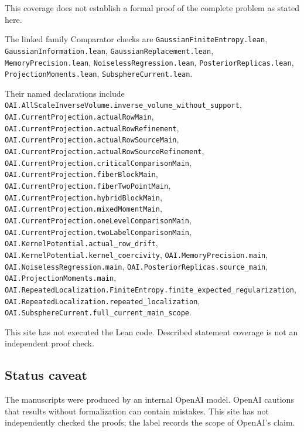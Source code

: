 \documentclass[11pt]{article}
\begin{document}
This coverage does not establish a formal proof of the complete problem as stated here.

The linked family Comparator checks are \texttt{GaussianFiniteEntropy.lean}, \texttt{GaussianInformation.lean}, \texttt{GaussianReplacement.lean}, \texttt{MemoryPrecision.lean}, \texttt{NoiselessRegression.lean}, \texttt{PosteriorReplicas.lean}, \texttt{ProjectionMoments.lean}, \texttt{SubsphereCurrent.lean}.

Their named declarations include \texttt{OAI.AllScaleInverseVolume.inverse\_volume\_without\_support}, \texttt{OAI.CurrentProjection.actualRowMain}, \texttt{OAI.CurrentProjection.actualRowRefinement}, \texttt{OAI.CurrentProjection.actualRowSourceMain}, \texttt{OAI.CurrentProjection.actualRowSourceRefinement}, \texttt{OAI.CurrentProjection.criticalComparisonMain}, \texttt{OAI.CurrentProjection.fiberBlockMain}, \texttt{OAI.CurrentProjection.fiberTwoPointMain}, \texttt{OAI.CurrentProjection.hybridBlockMain}, \texttt{OAI.CurrentProjection.mixedMomentMain}, \texttt{OAI.CurrentProjection.oneLevelComparisonMain}, \texttt{OAI.CurrentProjection.twoLabelComparisonMain}, \texttt{OAI.KernelPotential.actual\_row\_drift}, \texttt{OAI.KernelPotential.kernel\_coercivity}, \texttt{OAI.MemoryPrecision.main}, \texttt{OAI.NoiselessRegression.main}, \texttt{OAI.PosteriorReplicas.source\_main}, \texttt{OAI.ProjectionMoments.main}, \texttt{OAI.RepeatedLocalization.FiniteEntropy.finite\_expected\_regularization}, \texttt{OAI.RepeatedLocalization.repeated\_localization}, \texttt{OAI.SubsphereCurrent.full\_current\_main\_scope}.

This site has not executed the Lean code. Described statement coverage is not an independent proof check.

\subsection{Status caveat}
The manuscripts were produced by an internal OpenAI model. OpenAI cautions that results without formalization can contain mistakes. This site has not independently checked the proofs; the label records the scope of OpenAI's claim.
\end{document}
